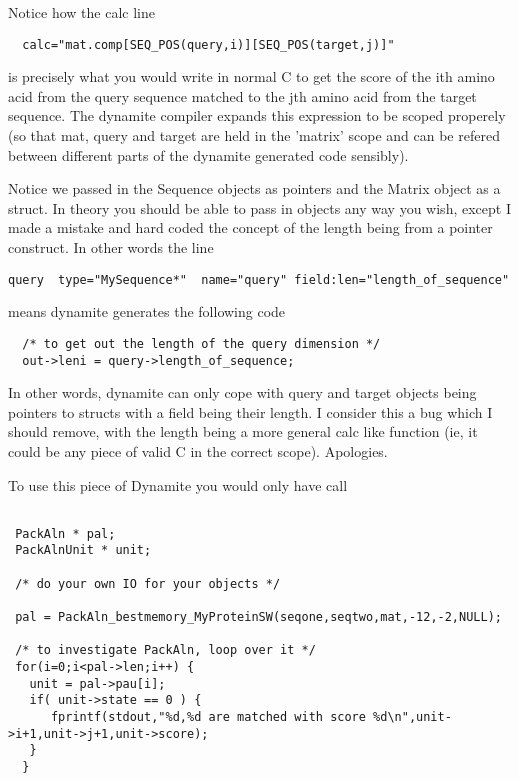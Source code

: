 Notice how the calc line

\begin{verbatim}
  calc="mat.comp[SEQ_POS(query,i)][SEQ_POS(target,j)]"
\end{verbatim}

is precisely what you would write in normal C to get the score of 
the ith amino acid from the query sequence matched to the jth amino
acid from the target sequence. The dynamite compiler expands this
expression to be scoped properely (so that mat, query and target are
held in the 'matrix' scope and can be refered between different parts
of the dynamite generated code sensibly).

Notice we passed in the Sequence objects as pointers and the Matrix object
as a struct. In theory you should be able to 
pass in objects any way you wish, except I made a mistake and hard coded
the concept of the length being from a pointer construct. In other words 
the line

\begin{verbatim}
query  type="MySequence*"  name="query" field:len="length_of_sequence"  
\end{verbatim}

means dynamite generates the following code

\begin{verbatim}
  /* to get out the length of the query dimension */
  out->leni = query->length_of_sequence;   
\end{verbatim}

In other words, dynamite can only cope with query and target objects
being pointers to structs with a field being their length. I consider
this a bug which I should remove, with the length being a more general
calc like function (ie, it could be any piece of valid C in the
correct scope). Apologies.

To use this piece of Dynamite you would only have call

\begin{verbatim}

 PackAln * pal;
 PackAlnUnit * unit;

 /* do your own IO for your objects */

 pal = PackAln_bestmemory_MyProteinSW(seqone,seqtwo,mat,-12,-2,NULL);

 /* to investigate PackAln, loop over it */
 for(i=0;i<pal->len;i++) {
   unit = pal->pau[i];
   if( unit->state == 0 ) {
      fprintf(stdout,"%d,%d are matched with score %d\n",unit->i+1,unit->j+1,unit->score);
   } 
  }

\end{verbatim}

